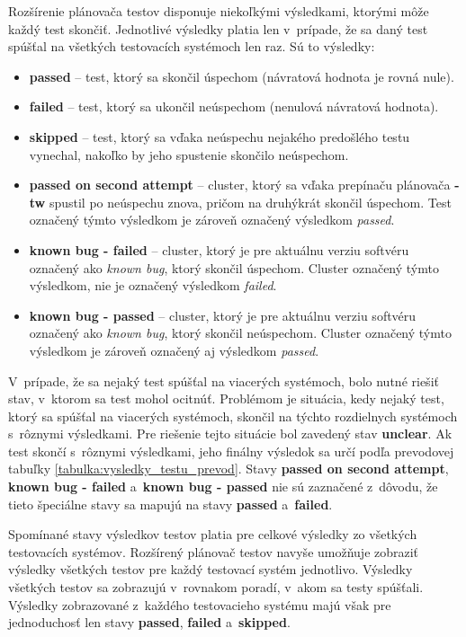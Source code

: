 Rozšírenie plánovača testov disponuje niekoľkými výsledkami, ktorými 
môže každý test skončiť. Jednotlivé výsledky platia len v~prípade, že 
sa daný test spúšťal na všetkých testovacích systémoch len raz. 
Sú to výsledky:
\begin{itemize}
\item \textbf{passed} -- test, ktorý sa skončil úspechom 
(návratová hodnota je rovná nule).
\item \textbf{failed} -- test, ktorý sa ukončil neúspechom 
(nenulová návratová hodnota).
\item \textbf{skipped} -- test, ktorý sa vďaka neúspechu nejakého predošlého 
testu vynechal, nakoľko by jeho spustenie skončilo neúspechom.
\item \textbf{passed on second attempt} -- cluster, ktorý sa vďaka 
prepínaču plánovača \textbf{-tw} spustil po neúspechu znova, pričom na 
druhýkrát skončil úspechom. 
Test označený týmto výsledkom je zároveň označený výsledkom \textit{passed}.
\item \textbf{known bug - failed} -- cluster, ktorý je pre aktuálnu 
verziu softvéru označený ako \textit{known bug}, ktorý skončil úspechom. 
Cluster označený týmto výsledkom, nie je označený výsledkom \textit{failed}.
\item \textbf{known bug - passed} -- cluster, ktorý je pre aktuálnu 
verziu softvéru označený ako \textit{known bug}, ktorý skončil neúspechom.
Cluster označený týmto výsledkom je zároveň označený aj výsledkom 
\textit{passed}.
\end{itemize} 

V~prípade, že sa nejaký test spúšťal na viacerých systémoch, bolo nutné 
riešiť stav, v~ktorom sa test mohol ocitnúť. Problémom je situácia, 
kedy nejaký test, ktorý sa spúšťal na viacerých systémoch, skončil na 
týchto rozdielnych systémoch s~rôznymi výsledkami.
Pre riešenie tejto situácie bol zavedený stav \textbf{unclear}. 
Ak test skončí s~rôznymi výsledkami, jeho finálny výsledok sa určí podľa 
prevodovej tabuľky \ref{tabulka:vysledky_testu_prevod}.
Stavy \textbf{passed on second attempt}, \textbf{known bug - failed}
a~\textbf{known bug - passed} nie sú zaznačené z~dôvodu, že tieto špeciálne 
stavy sa mapujú na stavy \textbf{passed} a~\textbf{failed}.

Spomínané stavy výsledkov testov platia pre celkové výsledky zo všetkých 
testovacích systémov. Rozšírený plánovač testov navyše umožňuje zobraziť 
výsledky všetkých testov pre každý testovací systém jednotlivo. 
Výsledky všetkých testov sa zobrazujú v~rovnakom poradí, v~akom sa testy spúšťali.
Výsledky zobrazované z~každého testovacieho systému majú však 
pre jednoduchosť len stavy \textbf{passed}, \textbf{failed} 
a~\textbf{skipped}. 

